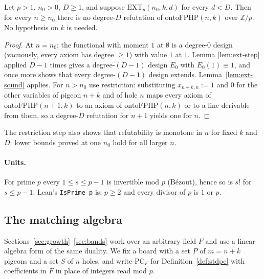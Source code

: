 \begin{theorem}\label{thm:ext-criterion}
Let $p>1$, $n_0>0$, $D\ge1$, and suppose $\mathrm{EXT}_p(n_0,k,d)$ for every $d<D$.
Then for every $n\ge n_0$ there is no degree-$D$ refutation of
$\mathrm{ontoFPHP}(n,k)$ over $\mathbb Z/p$.  No hypothesis on $k$ is
needed.
\end{theorem}

\begin{proof}
At $n=n_0$: the functional with moment $1$ at $\emptyset$ is a degree-$0$ design
(vacuously, every axiom has degree $\ge1$) with value $1$ at $1$.  Lemma
\ref{lem:ext-step} applied $D-1$ times gives a degree-$(D-1)$ design $E_0$ with
$E_0(1)\equiv1$, and once more shows that every degree-$(D-1)$ design
extends.  Lemma~\ref{lem:ext-sound} applies.
For $n>n_0$ use restriction: substituting $x_{n+k,n}:=1$ and $0$ for the other
variables of pigeon $n+k$ and of hole $n$ maps every axiom of
$\mathrm{ontoFPHP}(n+1,k)$ to an axiom of $\mathrm{ontoFPHP}(n,k)$ or to a line
derivable from them, so a degree-$D$ refutation for $n+1$ yields one for
$n$.
\end{proof}

The restriction step also shows that refutability is monotone in $n$ for fixed $k$ and
$D$: lower bounds proved at one $n_0$ hold for all larger $n$.

\paragraph{Units.}  For prime $p$ every $1\le s\le p-1$ is invertible mod $p$
(B\'ezout), hence so is $s!$ for $s\le p-1$.
Lean's \texttt{IsPrime p} is: $p\ge2$ and every divisor of $p$ is $1$ or
$p$.

\subsection{The matching algebra}\label{sec:defs-written}

Sections~\ref{sec:growth}--\ref{sec:bands} work over an arbitrary field $F$ and use a
linear-algebra form of the same duality.  We fix a board with a set $P$ of $m=n+k$ pigeons
and a set $S$ of $n$ holes, and write $\mathrm{PC}_F$ for Definition~\ref{def:stdpc} with
coefficients in $F$ in place of integers read mod $p$.

